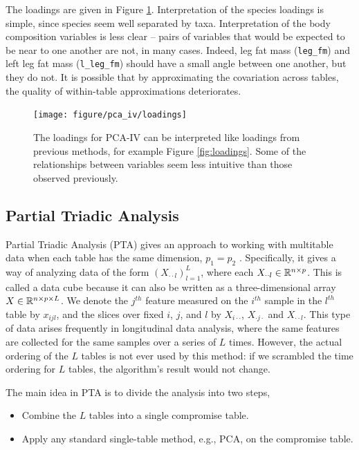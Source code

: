 \documentclass{article}
\begin{document}
The loadings are given in Figure \ref{fig:pca_iv_loadings}. Interpretation of
the species loadings is simple, since species seem well separated by taxa.
Interpretation of the body composition variables is less clear -- pairs of
variables that would be expected to be near to one another are not, in many
cases. Indeed, leg fat mass (\texttt{leg\_fm}) and left leg fat mass
(\texttt{l\_leg\_fm}) should have a small angle between one another, but they do
not. It is possible that by approximating the covariation across tables, the
quality of within-table approximations deteriorates.

\begin{figure}
  \centering
  \texttt{[image: figure/pca\_iv/loadings]}
  \caption{The loadings for PCA-IV can be interpreted like loadings from
    previous methods, for example Figure \ref{fig:loadings}. Some of the
    relationships between variables seem less intuitive than those observed
    previously.
    \label{fig:pca_iv_loadings} }
\end{figure}

\subsection{Partial Triadic Analysis}
\label{subsec:partial_triadic_analysis}

Partial Triadic Analysis (PTA) gives an approach to working with multitable data
when each table has the same dimension, $p_1 = p_2$ \citep{thioulouse2011simultaneous}.
Specifically, it gives a way of analyzing data of the form $\left(X_{\cdot\cdot
  l}\right)_{l = 1}^{L}$, where each $X_{\cdot\cdot l} \in \mathbb{R}^{n \times p}$.
This is called a data cube because it can also be written as a three-dimensional
array $X \in \mathbb{R}^{n \times p \times L}$. We denote the $j^{th}$ feature
measured on the $i^{th}$ sample in the $l^{th}$ table by $x_{ijl}$, and the
slices over fixed $i$, $j$, and $l$ by $X_{i \cdot \cdot}$, $X_{\cdot j \cdot}$
and $X_{\cdot \cdot l}$. This type of data arises frequently in longitudinal
data analysis, where the same features are collected for the same samples over
a series of $L$ times. However, the actual ordering of the $L$ tables is not
ever used by this method: if we scrambled the time ordering for $L$ tables, the
algorithm's result would not change.

The main idea in PTA is to divide the analysis into two steps,
\begin{itemize}
  \item Combine the $L$ tables into a single compromise table.
  \item Apply any standard single-table method, e.g., PCA, on the
    compromise table.
\end{itemize}
\end{document}
